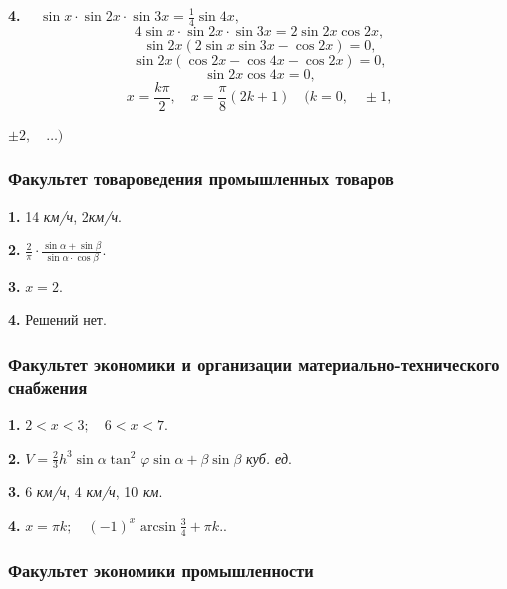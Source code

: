     \textbf{4. } \(\quad \sin{x}\cdot\sin{2x}\cdot\sin{3x} = \frac{1}{4}\sin{4x},\)
    \[4\sin{x}\cdot\sin{2x}\cdot\sin{3x} = 2\sin{2x}\cos{2x},\]
    \[\sin{2x}(2\sin{x}\sin{3x} - \cos{2x})=0,\]
    \[\sin{2x}(\cos{2x} - \cos{4x} - \cos{2x})=0,\]
    \[\sin{2x}\cos{4x}=0,\]
    \[x=\frac{k\pi}{2}, \quad x= \frac{\pi}{8}(2k+1) \quad (k=0, \quad \pm1,\]
    \begin{flushright}
        \(\pm2,\quad\dots)\)
    \end{flushright}
    \begin{center}
    \subsubsection*{Факультет товароведения промышленных товаров}
    \end{center}\par
    \begin{doublespace}
    \textbf{1.} 14 \textit{км/ч}, 2\textit{км/ч}.\par
    \textbf{2.} \(\frac{2}{\pi}\cdot\frac{\sin{\alpha} + \sin{\beta}}{\sin{\alpha}\cdot\cos{\beta}}\).\par
    \textbf{3.} \(x=2\).\par
    \textbf{4.} Решений нет.\par
    \end{doublespace}\par
    \begin{center}
    \subsubsection*{Факультет экономики и организации материально-технического снабжения}
    \end{center}\par
    \begin{doublespace}
    \textbf{1.} \(2<x<3; \quad 6<x<7\).\par
    \textbf{2.} \(V=\frac{2}{3}h^3\sin{\alpha}\tan^2{\varphi}\sin{\alpha+\beta}\sin{\beta}\) \textit{куб. ед}.\par
    \textbf{3.} 6 \textit{км/ч}, 4 \textit{км/ч}, 10 \textit{км}.\par
    \textbf{4.} \(x=\pi k; \quad (-1)^{x}\arcsin{\frac{3}{4}} + \pi k.\).\par
    \end{doublespace}
    \begin{center}
    \subsubsection*{Факультет экономики промышленности}
    \end{center}\par
